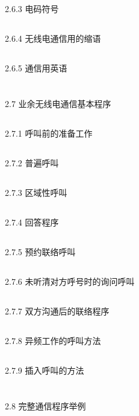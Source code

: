 \documentclass[12pt,UTF8]{ctexbook}
\begin{document}
\subsection{}2.6.3 电码符号
\subsection{}2.6.4 无线电通信用的缩语
\subsection{}2.6.5 通信用英语
\section{}2.7 业余无线电通信基本程序
\subsection{}2.7.1 呼叫前的准备工作
\subsection{}2.7.2 普遍呼叫
\subsection{}2.7.3 区域性呼叫
\subsection{}2.7.4 回答程序
\subsection{}2.7.5 预约联络呼叫
\subsection{}2.7.6 未听清对方呼号时的询问呼叫
\subsection{}2.7.7 双方沟通后的联络程序
\subsection{}2.7.8 异频工作的呼叫方法
\subsection{}2.7.9 插入呼叫的方法
\section{}2.8 完整通信程序举例
\end{document}
